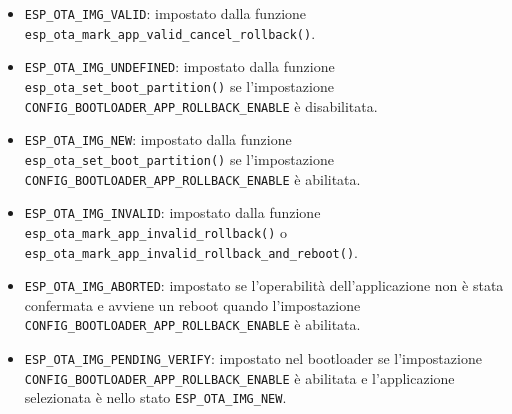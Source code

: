 \documentclass[a4paper]{article}
\begin{document}
\begin{itemize}
  \item \texttt{ESP\_OTA\_IMG\_VALID}: impostato dalla funzione \\
    \texttt{esp\_ota\_mark\_app\_valid\_cancel\_rollback()}.

  \item \texttt{ESP\_OTA\_IMG\_UNDEFINED}: impostato dalla funzione \\
    \texttt{esp\_ota\_set\_boot\_partition()} se l'impostazione \\
    \texttt{CONFIG\_BOOTLOADER\_APP\_ROLLBACK\_ENABLE} è disabilitata.

  \item \texttt{ESP\_OTA\_IMG\_NEW}: impostato dalla funzione \\
    \texttt{esp\_ota\_set\_boot\_partition()} se l'impostazione \\
    \texttt{CONFIG\_BOOTLOADER\_APP\_ROLLBACK\_ENABLE} è abilitata.

  \item \texttt{ESP\_OTA\_IMG\_INVALID}: impostato dalla funzione \\
    \texttt{esp\_ota\_mark\_app\_invalid\_rollback()} o \\
    \texttt{esp\_ota\_mark\_app\_invalid\_rollback\_and\_reboot()}.

  \item \texttt{ESP\_OTA\_IMG\_ABORTED}: impostato se l'operabilità dell'applicazione non
    è stata confermata e avviene un reboot quando l'impostazione \\
    \texttt{CONFIG\_BOOTLOADER\_APP\_ROLLBACK\_ENABLE} è abilitata.

  \item \texttt{ESP\_OTA\_IMG\_PENDING\_VERIFY}: impostato nel bootloader se l'impostazione \\
    \texttt{CONFIG\_BOOTLOADER\_APP\_ROLLBACK\_ENABLE} è abilitata e l'applicazione
    selezionata è nello stato \texttt{ESP\_OTA\_IMG\_NEW}.
\end{itemize}



\end{document}
